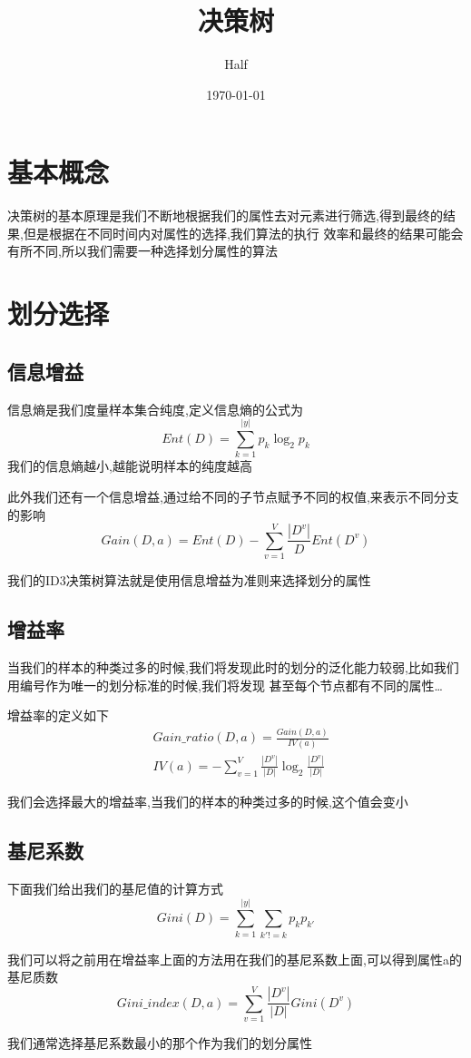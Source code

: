\documentclass[UTF8]{ctexart}
\title{决策树}
\author{Half}
\date{\today}
\begin{document}
\maketitle
\section{基本概念}
决策树的基本原理是我们不断地根据我们的属性去对元素进行筛选,得到最终的结果,但是根据在不同时间内对属性的选择,我们算法的执行
效率和最终的结果可能会有所不同,所以我们需要一种选择划分属性的算法
\section{划分选择}
\subsection{信息增益}
信息熵是我们度量样本集合纯度,定义信息熵的公式为
\begin{equation}
    Ent(D) = \sum_{k=1}^{|y|}p_k\log_2p_k
\end{equation}
我们的信息熵越小,越能说明样本的纯度越高
\par 
此外我们还有一个信息增益,通过给不同的子节点赋予不同的权值,来表示不同分支的影响
\begin{equation}
    Gain(D,a) = Ent(D) - \sum_{v=1}^{V}\frac{|D^v|}{D}Ent(D^v)
\end{equation}
\par 
我们的ID3决策树算法就是使用信息增益为准则来选择划分的属性
\subsection{增益率}
当我们的样本的种类过多的时候,我们将发现此时的划分的泛化能力较弱,比如我们用编号作为唯一的划分标准的时候,我们将发现
甚至每个节点都有不同的属性\dots
\par 
增益率的定义如下
\begin{equation}
    \begin{aligned}
        &Gain\_ratio(D,a) = \frac{Gain(D,a)}{IV(a)}\\
        &IV(a) = -\sum_{v=1}^V\frac{|D^v|}{|D|}\log_2\frac{|D^v|}{|D|}
    \end{aligned}
\end{equation}
\par 
我们会选择最大的增益率,当我们的样本的种类过多的时候,这个值会变小
\subsection{基尼系数}
下面我们给出我们的基尼值的计算方式
\begin{equation}
    Gini(D) = \sum_{k=1}^{|y|}\sum_{k'!=k}p_kp_{k'}
\end{equation}
\par 
我们可以将之前用在增益率上面的方法用在我们的基尼系数上面,可以得到属性a的基尼质数
\begin{equation}
    Gini\_index(D,a) = \sum_{v=1}^V\frac{|D^v|}{|D|}Gini(D^v)
\end{equation}
\par 我们通常选择基尼系数最小的那个作为我们的划分属性
\end{document}
